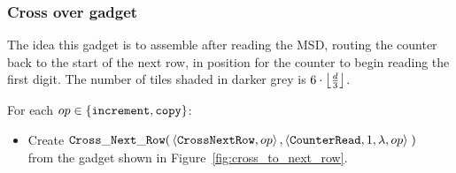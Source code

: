 
\subsubsection{Cross over gadget}

The idea this gadget is to assemble after reading the MSD, routing the counter back to the start of the
next row, in position for the counter to begin reading the first digit.
The number of tiles shaded in darker grey is $6 \cdot \floor*{\frac{d}{3}}$.

\vspace{.5cm}
For each $\inc\in \{ {\tt increment}, {\tt copy} \}$:

\begin{itemize}
    \item Create
    $\begin{aligned}[t]
        {\tt Cross\_Next\_Row}(&\left\langle {\tt CrossNextRow},            \inc \right\rangle,
                                \left\langle {\tt CounterRead},        1, \lambda, \inc \right\rangle \;)
    \end{aligned}$\\from the gadget shown in Figure~\ref{fig:cross_to_next_row}.
\end{itemize}


